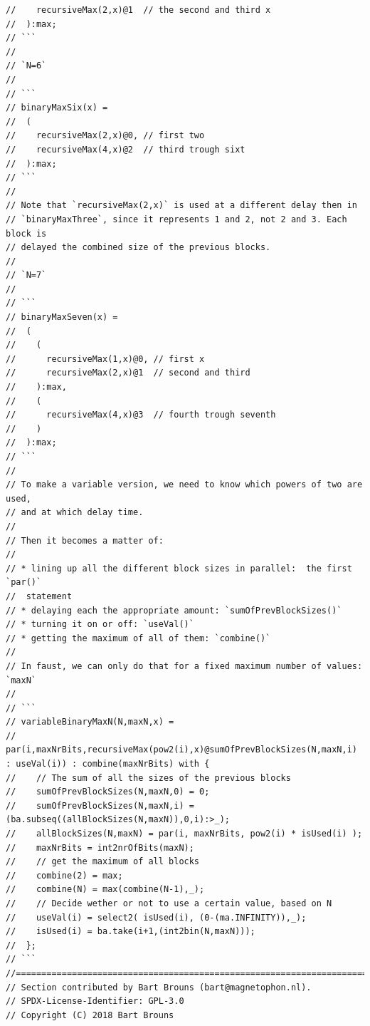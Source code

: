 \documentclass{article}
\begin{document}
\begin{lstlisting}[caption=\texttt{basics.lib}]
//    recursiveMax(2,x)@1  // the second and third x
//  ):max;
// ```
//
// `N=6`
//
// ```
// binaryMaxSix(x) =
//  (
//    recursiveMax(2,x)@0, // first two
//    recursiveMax(4,x)@2  // third trough sixt
//  ):max;
// ```
//
// Note that `recursiveMax(2,x)` is used at a different delay then in
// `binaryMaxThree`, since it represents 1 and 2, not 2 and 3. Each block is
// delayed the combined size of the previous blocks.
//
// `N=7`
//
// ```
// binaryMaxSeven(x) =
//  (
//    (
//      recursiveMax(1,x)@0, // first x
//      recursiveMax(2,x)@1  // second and third
//    ):max,
//    (
//      recursiveMax(4,x)@3  // fourth trough seventh
//    )
//  ):max;
// ```
//
// To make a variable version, we need to know which powers of two are used,
// and at which delay time.
//
// Then it becomes a matter of:
//
// * lining up all the different block sizes in parallel:  the first `par()`
//  statement
// * delaying each the appropriate amount: `sumOfPrevBlockSizes()`
// * turning it on or off: `useVal()`
// * getting the maximum of all of them: `combine()`
//
// In faust, we can only do that for a fixed maximum number of values: `maxN`
//
// ```
// variableBinaryMaxN(N,maxN,x) =
//  par(i,maxNrBits,recursiveMax(pow2(i),x)@sumOfPrevBlockSizes(N,maxN,i)  : useVal(i)) : combine(maxNrBits) with {
//    // The sum of all the sizes of the previous blocks
//    sumOfPrevBlockSizes(N,maxN,0) = 0;
//    sumOfPrevBlockSizes(N,maxN,i) = (ba.subseq((allBlockSizes(N,maxN)),0,i):>_);
//    allBlockSizes(N,maxN) = par(i, maxNrBits, pow2(i) * isUsed(i) );
//    maxNrBits = int2nrOfBits(maxN);
//    // get the maximum of all blocks
//    combine(2) = max;
//    combine(N) = max(combine(N-1),_);
//    // Decide wether or not to use a certain value, based on N
//    useVal(i) = select2( isUsed(i), (0-(ma.INFINITY)),_);
//    isUsed(i) = ba.take(i+1,(int2bin(N,maxN)));
//  };
// ```
//========================================================================================
// Section contributed by Bart Brouns (bart@magnetophon.nl).
// SPDX-License-Identifier: GPL-3.0
// Copyright (C) 2018 Bart Brouns


\end{lstlisting}
\end{document}

